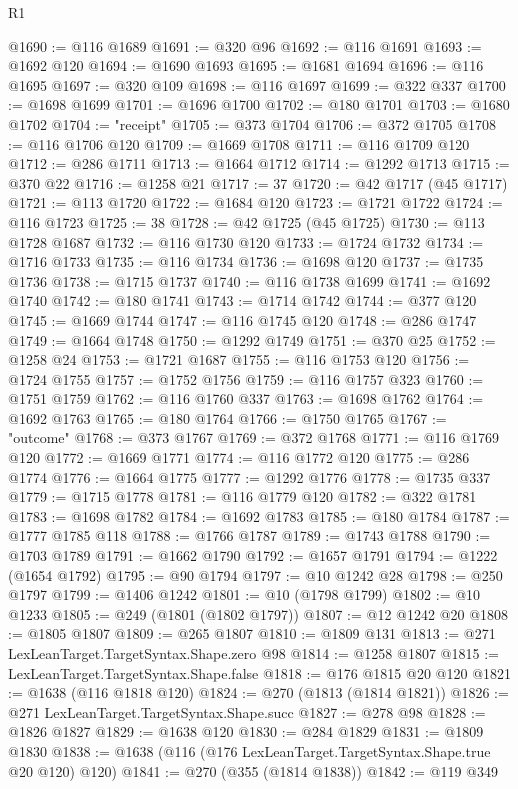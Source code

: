 \begin{lexlean}{R1}
\begin{coremodule}
@1690 := @116 @1689
@1691 := @320 @96
@1692 := @116 @1691
@1693 := @1692 @120
@1694 := @1690 @1693
@1695 := @1681 @1694
@1696 := @116 @1695
@1697 := @320 @109
@1698 := @116 @1697
@1699 := @322 @337
@1700 := @1698 @1699
@1701 := @1696 @1700
@1702 := @180 @1701
@1703 := @1680 @1702
@1704 := "receipt"
@1705 := @373 @1704
@1706 := @372 @1705
@1708 := @116 @1706 @120
@1709 := @1669 @1708
@1711 := @116 @1709 @120
@1712 := @286 @1711
@1713 := @1664 @1712
@1714 := @1292 @1713
@1715 := @370 @22
@1716 := @1258 @21
@1717 := 37
@1720 := @42 @1717 (@45 @1717)
@1721 := @113 @1720
@1722 := @1684 @120
@1723 := @1721 @1722
@1724 := @116 @1723
@1725 := 38
@1728 := @42 @1725 (@45 @1725)
@1730 := @113 @1728 @1687
@1732 := @116 @1730 @120
@1733 := @1724 @1732
@1734 := @1716 @1733
@1735 := @116 @1734
@1736 := @1698 @120
@1737 := @1735 @1736
@1738 := @1715 @1737
@1740 := @116 @1738 @1699
@1741 := @1692 @1740
@1742 := @180 @1741
@1743 := @1714 @1742
@1744 := @377 @120
@1745 := @1669 @1744
@1747 := @116 @1745 @120
@1748 := @286 @1747
@1749 := @1664 @1748
@1750 := @1292 @1749
@1751 := @370 @25
@1752 := @1258 @24
@1753 := @1721 @1687
@1755 := @116 @1753 @120
@1756 := @1724 @1755
@1757 := @1752 @1756
@1759 := @116 @1757 @323
@1760 := @1751 @1759
@1762 := @116 @1760 @337
@1763 := @1698 @1762
@1764 := @1692 @1763
@1765 := @180 @1764
@1766 := @1750 @1765
@1767 := "outcome"
@1768 := @373 @1767
@1769 := @372 @1768
@1771 := @116 @1769 @120
@1772 := @1669 @1771
@1774 := @116 @1772 @120
@1775 := @286 @1774
@1776 := @1664 @1775
@1777 := @1292 @1776
@1778 := @1735 @337
@1779 := @1715 @1778
@1781 := @116 @1779 @120
@1782 := @322 @1781
@1783 := @1698 @1782
@1784 := @1692 @1783
@1785 := @180 @1784
@1787 := @1777 @1785 @118
@1788 := @1766 @1787
@1789 := @1743 @1788
@1790 := @1703 @1789
@1791 := @1662 @1790
@1792 := @1657 @1791
@1794 := @1222 (@1654 @1792)
@1795 := @90 @1794
@1797 := @10 @1242 @28
@1798 := @250 @1797
@1799 := @1406 @1242
@1801 := @10 (@1798 @1799)
@1802 := @10 @1233
@1805 := @249 (@1801 (@1802 @1797))
@1807 := @12 @1242 @20
@1808 := @1805 @1807
@1809 := @265 @1807
@1810 := @1809 @131
@1813 := @271 LexLeanTarget.TargetSyntax.Shape.zero @98
@1814 := @1258 @1807
@1815 := LexLeanTarget.TargetSyntax.Shape.false
@1818 := @176 @1815 @20 @120
@1821 := @1638 (@116 @1818 @120)
@1824 := @270 (@1813 (@1814 @1821))
@1826 := @271 LexLeanTarget.TargetSyntax.Shape.succ
@1827 := @278 @98
@1828 := @1826 @1827
@1829 := @1638 @120
@1830 := @284 @1829
@1831 := @1809 @1830
@1838 := @1638 (@116 (@176 LexLeanTarget.TargetSyntax.Shape.true @20 @120) @120)
@1841 := @270 (@355 (@1814 @1838))
@1842 := @119 @349

\end{coremodule}
\end{lexlean}
